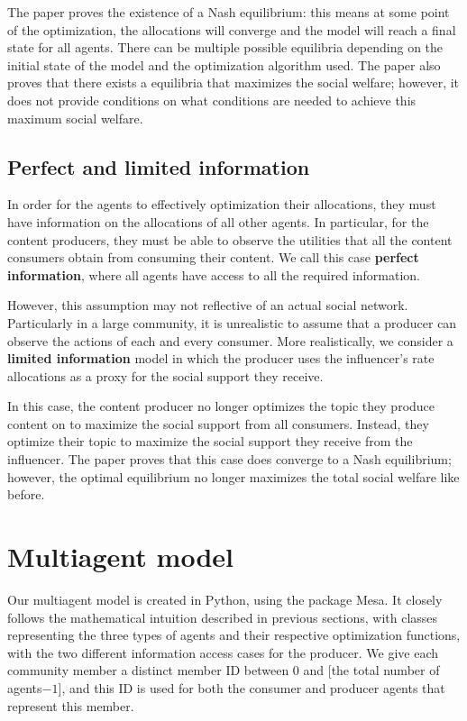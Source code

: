 \documentclass[11pt, letterpaper]{article}
\begin{document}
The paper proves the existence of a Nash equilibrium: this means at some point of the optimization, the allocations will converge and the model will reach a final state for all agents. There can be multiple possible equilibria depending on the initial state of the model and the optimization algorithm used. The paper also proves that there exists a equilibria that maximizes the social welfare; however, it does not provide conditions on what conditions are needed to achieve this maximum social welfare.

\subsection{Perfect and limited information}

In order for the agents to effectively optimization their allocations, they must have information on the allocations of all other agents. In particular, for the content producers, they must be able to observe the utilities that all the content consumers obtain from consuming their content. We call this case \textbf{perfect information}, where all agents have access to all the required information.

However, this assumption may not reflective of an actual social network. Particularly in a large community, it is unrealistic to assume that a producer can observe the actions of each and every consumer. More realistically, we consider a \textbf{limited information} model in which the producer uses the influencer's rate allocations as a proxy for the social support they receive.

In this case, the content producer no longer optimizes the topic they produce content on to maximize the social support from all consumers. Instead, they optimize their topic to maximize the social support they receive from the influencer. The paper proves that this case does converge to a Nash equilibrium; however, the optimal equilibrium no longer maximizes the total social welfare like before.

\section{Multiagent model}

Our multiagent model is created in Python, using the package Mesa. It closely follows the mathematical intuition described in previous sections, with classes representing the three types of agents and their respective optimization functions, with the two different information access cases for the producer. We give each community member a distinct member ID between 0 and [the total number of agents\(-1\)], and this ID is used for both the consumer and producer agents that represent this member.
\end{document}
